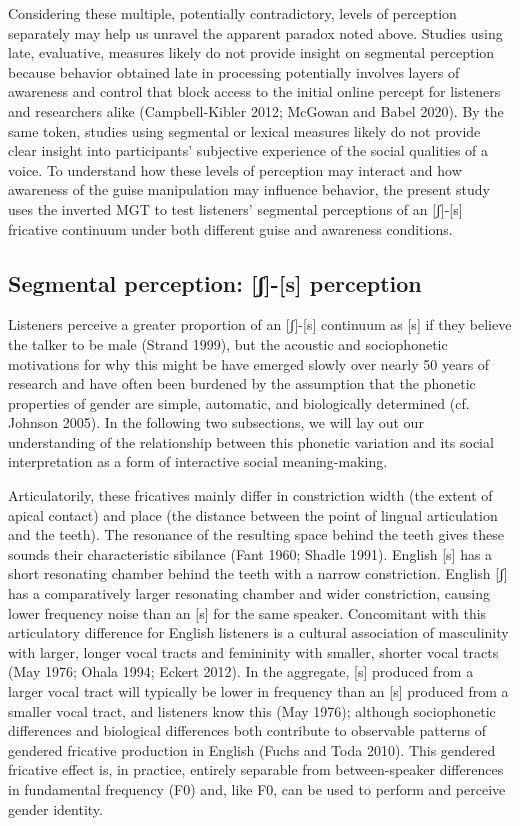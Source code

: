 \documentclass[
  letterpaper,
  DIV=11,
  numbers=noendperiod]{scrartcl}
\begin{document}
Considering these multiple, potentially contradictory, levels of
perception separately may help us unravel the apparent paradox noted
above. Studies using late, evaluative, measures likely do not provide
insight on segmental perception because behavior obtained late in
processing potentially involves layers of awareness and control that
block access to the initial online percept for listeners and researchers
alike (Campbell-Kibler 2012; McGowan and Babel 2020). By the same token,
studies using segmental or lexical measures likely do not provide clear
insight into participants' subjective experience of the social qualities
of a voice. To understand how these levels of perception may interact
and how awareness of the guise manipulation may influence behavior, the
present study uses the inverted MGT to test listeners' segmental
perceptions of an {[}ʃ{]}-{[}s{]} fricative continuum under both
different guise and awareness conditions.

\subsection{Segmental perception: {[}ʃ{]}-{[}s{]}
perception}\label{sec-fricative-gender}

Listeners perceive a greater proportion of an {[}ʃ{]}-{[}s{]} continuum
as {[}s{]} if they believe the talker to be male (Strand 1999), but the
acoustic and sociophonetic motivations for why this might be have
emerged slowly over nearly 50 years of research and have often been
burdened by the assumption that the phonetic properties of gender are
simple, automatic, and biologically determined (cf. Johnson 2005). In
the following two subsections, we will lay out our understanding of the
relationship between this phonetic variation and its social
interpretation as a form of interactive social meaning-making.

Articulatorily, these fricatives mainly differ in constriction width
(the extent of apical contact) and place (the distance between the point
of lingual articulation and the teeth). The resonance of the resulting
space behind the teeth gives these sounds their characteristic sibilance
(Fant 1960; Shadle 1991). English {[}s{]} has a short resonating chamber
behind the teeth with a narrow constriction. English {[}ʃ{]} has a
comparatively larger resonating chamber and wider constriction, causing
lower frequency noise than an {[}s{]} for the same speaker. Concomitant
with this articulatory difference for English listeners is a cultural
association of masculinity with larger, longer vocal tracts and
femininity with smaller, shorter vocal tracts (May 1976; Ohala 1994;
Eckert 2012). In the aggregate, {[}s{]} produced from a larger vocal
tract will typically be lower in frequency than an {[}s{]} produced from
a smaller vocal tract, and listeners know this (May 1976); although
sociophonetic differences and biological differences both contribute to
observable patterns of gendered fricative production in English (Fuchs
and Toda 2010). This gendered fricative effect is, in practice, entirely
separable from between-speaker differences in fundamental frequency (F0)
and, like F0, can be used to perform and perceive gender identity.
\end{document}
